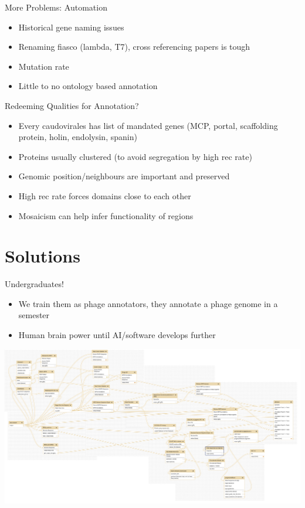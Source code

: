 \documentclass[12pt]{beamer}
\begin{document}
\begin{frame}{More Problems: Automation}
    \begin{itemize}
        \item Historical gene naming issues
        \item Renaming fiasco (lambda, T7), cross referencing papers is tough
        \item Mutation rate
        \item Little to no ontology based annotation
    \end{itemize}
\end{frame}

\begin{frame}{Redeeming Qualities for Annotation?}
    \begin{itemize}
        \item Every caudovirales has list of mandated genes (MCP, portal, scaffolding protein, holin, endolysin, spanin)
        \item Proteins usually clustered (to avoid segregation by high rec rate)
        \item Genomic position/neighbours are important and preserved
        \item High rec rate forces domains close to each other
        \item Mosaicism can help infer functionality of regions
    \end{itemize}
\end{frame}

\section{Solutions}
\begin{frame}{Undergraduates!}
    \begin{itemize}
        \item We train them as phage annotators, they annotate a phage genome in a semester
        \item Human brain power until AI/software develops further
    \end{itemize}
    \centering
    \includegraphics[width=\textwidth]{./pap2016.png}
\end{frame}
\end{document}
